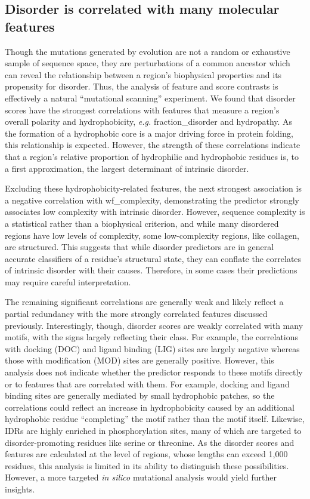 \subsection{Disorder is correlated with many molecular features}
Though the mutations generated by evolution are not a random or exhaustive sample of sequence space, they are perturbations of a common ancestor which can reveal the relationship between a region's biophysical properties and its propensity for disorder. Thus, the analysis of feature and score contrasts is effectively a natural ``mutational scanning'' experiment. We found that disorder scores have the strongest correlations with features that measure a region's overall polarity and hydrophobicity, \textit{e.g.} fraction\_disorder and hydropathy. As the formation of a hydrophobic core is a major driving force in protein folding, this relationship is expected. However, the strength of these correlations indicate that a region's relative proportion of hydrophilic and hydrophobic residues is, to a first approximation, the largest determinant of intrinsic disorder.

Excluding these hydrophobicity-related features, the next strongest association is a negative correlation with wf\_complexity, demonstrating the predictor strongly associates low complexity with intrinsic disorder. However, sequence complexity is a statistical rather than a biophysical criterion, and while many disordered regions have low levels of complexity, some low-complexity regions, like collagen, are structured. This suggests that while disorder predictors are in general accurate classifiers of a residue's structural state, they can conflate the correlates of intrinsic disorder with their causes. Therefore, in some cases their predictions may require careful interpretation.

The remaining significant correlations are generally weak and likely reflect a partial redundancy with the more strongly correlated features discussed previously. Interestingly, though, disorder scores are weakly correlated with many motifs, with the signs largely reflecting their class. For example, the correlations with docking (DOC) and ligand binding (LIG) sites are largely negative whereas those with modification (MOD) sites are generally positive. However, this analysis does not indicate whether the predictor responds to these motifs directly or to features that are correlated with them. For example, docking and ligand binding sites are generally mediated by small hydrophobic patches, so the correlations could reflect an increase in hydrophobicity caused by an additional hydrophobic residue ``completing'' the motif rather than the motif itself. Likewise, IDRs are highly enriched in phosphorylation sites, many of which are targeted to disorder-promoting residues like serine or threonine. As the disorder scores and features are calculated at the level of regions, whose lengths can exceed 1,000 residues, this analysis is limited in its ability to distinguish these possibilities. However, a more targeted \textit{in silico} mutational analysis would yield further insights.

